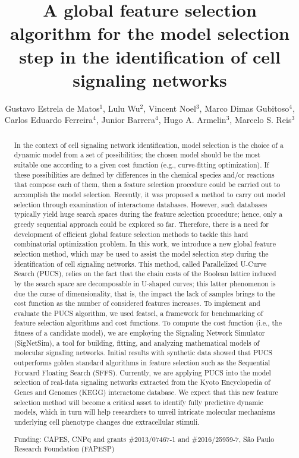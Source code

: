 \documentclass[twoside]{article}
\title{\vspace{-15mm}\fontsize{24pt}{10pt}\selectfont\textbf{A global feature selection algorithm for the model selection step in the identification of cell signaling networks}} %
\author{Gustavo Estrela de Matos$^1$, Lulu Wu$^2$, Vincent Noel$^3$, Marco Dimas Gubitoso$^4$, Carlos Eduardo Ferreira$^4$, Junior Barrera$^4$, Hugo A. Armelin$^3$, Marcelo S. Reis$^3$}
\affil{1 CENTER OF TOXINS, IMMUNE-RESPONSE AND CELL SIGNALING, INSTITUTO BUTANTAN, INSTITUTO DE MATEM\'ATICA E ESTAT\'ISTICA\\ 2 CENTER OF TOXINS, IMMUNE-RESPONSE AND CELL SIGNALING, INSTITUTO BUTANTAN\\ 3 INSTITUTO BUTANTAN\\ 4 INSTITUTO DE MATEM\'ATICA E ESTAT\'ISTICA, USP\\ }
\date{}
\begin{document}
\maketitle %

\thispagestyle{fancy} %


\begin{abstract}
In the context of cell signaling network identification, model selection is the choice of a dynamic
model from a set of possibilities; the chosen model should be the most suitable one according to a
given cost function (e.g., curve-fitting optimization). If these possibilities are defined by differences
in the chemical species and/or reactions that compose each of them, then a feature selection
procedure could be carried out to accomplish the model selection. Recently, it was proposed a
method to carry out model selection through examination of interactome databases. However, such
databases typically yield huge search spaces during the feature selection procedure; hence, only a
greedy sequential approach could be explored so far. Therefore, there is a need for development of
efficient global feature selection methods to tackle this hard combinatorial optimization problem. In
this work, we introduce a new global feature selection method, which may be used to assist the
model selection step during the identification of cell signaling networks. This method, called
Parallelized U-Curve Search (PUCS), relies on the fact that the chain costs of the Boolean lattice
induced by the search space are decomposable in U-shaped curves; this latter phenomenon is due
the curse of dimensionality, that is, the impact the lack of samples brings to the cost function as the
number of considered features increases. To implement and evaluate the PUCS algorithm, we used
featsel, a framework for benchmarking of feature selection algorithms and cost functions. To
compute the cost function (i.e., the fitness of a candidate model), we are employing the Signaling
Network Simulator (SigNetSim), a tool for building, fitting, and analyzing mathematical models of
molecular signaling networks. Initial results with synthetic data showed that PUCS outperforms
golden standard algorithms in feature selection such as the Sequential Forward Floating Search
(SFFS). Currently, we are applying PUCS into the model selection of real-data signaling networks
extracted from the Kyoto Encyclopedia of Genes and Genomes (KEGG) interactome database. We
expect that this new feature selection method will become a critical asset to identify fully predictive
dynamic models, which in turn will help researchers to unveil intricate molecular mechanisms
underlying cell phenotype changes due extracellular stimuli.

Funding: CAPES, CNPq and grants \#2013/07467-1 and \#2016/25959-7, S\~ao Paulo Research Foundation (FAPESP)
\end{abstract}
\end{document}
